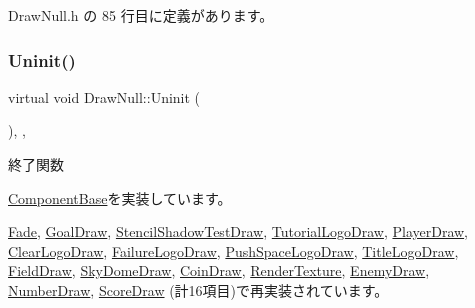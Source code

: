  Draw\+Null.\+h の 85 行目に定義があります。

\mbox{\label{class_draw_null_a12d44e341c7364b5ab9cdd661dc16187}} 
\subsubsection{\texorpdfstring{Uninit()}{Uninit()}}
{\footnotesize\ttfamily virtual void Draw\+Null\+::\+Uninit (\begin{DoxyParamCaption}{ }\end{DoxyParamCaption})\hspace{0.3cm}{\ttfamily [inline]}, {\ttfamily [override]}, {\ttfamily [virtual]}}



終了関数 



\mbox{\hyperlink{class_component_base_a9f42beaf0383d6f629819579cab4de57}{Component\+Base}}を実装しています。



\mbox{\hyperlink{class_fade_ae77d06811869d3c8162a42c3e0e14f7f}{Fade}}, \mbox{\hyperlink{class_goal_draw_a01318a0606848a3ca8ca7b7acbf4df24}{Goal\+Draw}}, \mbox{\hyperlink{class_stencil_shadow_test_draw_ad0672bf4ecfc8091cf54ed6f2c76b618}{Stencil\+Shadow\+Test\+Draw}}, \mbox{\hyperlink{class_tutorial_logo_draw_a949fb70954e3df28f87b8ed5c61bf8f1}{Tutorial\+Logo\+Draw}}, \mbox{\hyperlink{class_player_draw_a917b2947914287f23d87ca75cd68f553}{Player\+Draw}}, \mbox{\hyperlink{class_clear_logo_draw_aa73db5b701e644f8e552ddb254a0a9aa}{Clear\+Logo\+Draw}}, \mbox{\hyperlink{class_failure_logo_draw_a97646253380b54f37565650e211f33cd}{Failure\+Logo\+Draw}}, \mbox{\hyperlink{class_push_space_logo_draw_a79021c1df43968d6008de74126d53fba}{Push\+Space\+Logo\+Draw}}, \mbox{\hyperlink{class_title_logo_draw_a07bbf9e8de5c7b9ee028408496c13c50}{Title\+Logo\+Draw}}, \mbox{\hyperlink{class_field_draw_a89a78212c141714d9e39e25e663aaeff}{Field\+Draw}}, \mbox{\hyperlink{class_sky_dome_draw_aee1c6b102a97033073b2559b8c2c328b}{Sky\+Dome\+Draw}}, \mbox{\hyperlink{class_coin_draw_a6484c22a5598e298f18e7cd6083cd551}{Coin\+Draw}}, \mbox{\hyperlink{class_render_texture_a0e55cd9b412d87dfe1f4b90f29f357c8}{Render\+Texture}}, \mbox{\hyperlink{class_enemy_draw_a2861dc0623b0be7726bc69a6a469190e}{Enemy\+Draw}}, \mbox{\hyperlink{class_number_draw_a2b203d101f23f0d3f584937ff5ad662a}{Number\+Draw}}, \mbox{\hyperlink{class_score_draw_aad744f8a7a1202e6ba8117c660f297ee}{Score\+Draw}} (計16項目)で再実装されています。



